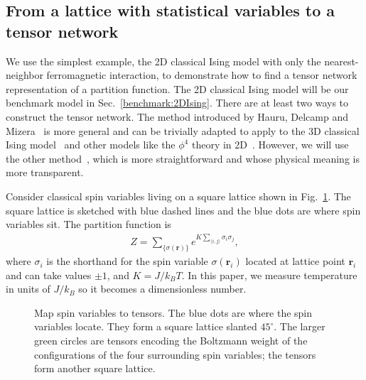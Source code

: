 \documentclass[aps,prb,reprint,superscriptaddress,floatfix]{revtex4-2}
\begin{document}
\subsection{From a lattice with statistical variables to a tensor
network\label{spin2tensor}} We use the simplest example, the 2D
classical Ising model with only the nearest-neighbor ferromagnetic
interaction, to demonstrate how to find a tensor network representation
of a partition function. The 2D classical Ising model will be our
benchmark model in Sec.~\ref{benchmark:2DIsing}.  There are at least two
ways to construct the tensor network. The method introduced by Hauru,
Delcamp and Mizera~\cite{gilts} is more general and can be trivially
adapted to apply to the 3D classical Ising model~\cite{hotrg} and other
models like the $\phi^4$ theory in 2D~\cite{Delcamp2020}. However, we
will use the other method~\cite{trg, tnr}, which is more straightforward
and whose physical meaning is more transparent.
%

Consider classical spin variables living on a square lattice shown in
Fig.~\ref{fig:spin2tensor}. The square lattice is sketched with blue
dashed lines and the blue dots are where spin variables sit. The
partition function is
%
\begin{align}\label{eq:2DIsingZ} Z =
\sum_{\{\sigma(\mathbf{r})\}}e^{K\sum_{\langle i,j \rangle}\sigma_i
\sigma_j}, \end{align} where $\sigma_i$ is the shorthand for the spin
variable $\sigma(\mathbf{r}_i)$ located at lattice point $\mathbf{r}_i$
and can take values $\pm 1$, and $K = J / k_B T$. In this paper, we
measure temperature in units of $J / k_B $ so it becomes a dimensionless
number.
\begin{figure}[htb]
    \caption{\label{fig:spin2tensor}Map spin variables to tensors.  The
        blue dots are where the spin variables locate. They form a
        square lattice slanted $45^\circ$. The larger green circles are
        tensors encoding the Boltzmann weight of the configurations of
the four surrounding spin variables; the tensors form another square
lattice.} \end{figure}
%
\end{document}
